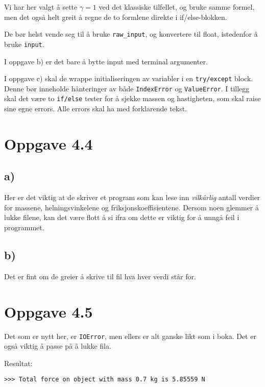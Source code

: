 \documentclass[10pt,a4paper]{article}
\begin{document}
Vi har her valgt å sette $\gamma = 1$ ved det klassiske tilfellet, og bruke samme formel, men det også helt greit å regne de to formlene direkte i if/else-blokken.

De bør helst vende seg til å bruke \texttt{raw\_input}, og konvertere til float, istedenfor å bruke \texttt{input}.

I oppgave b) er det bare å bytte input med terminal argumenter.

I oppgave c) skal de wrappe initialiseringen av variabler i en \texttt{try/except} block. Denne bør inneholde hånteringer av både \texttt{IndexError} og \texttt{ValueError}. I tillegg skal det være to \texttt{if/else} tester for å sjekke massen og hastigheten, som skal raise sine egne errors. Alle errors skal ha med forklarende tekst.




\newpage
\section*{Oppgave 4.4}
\subsection*{a)}
Her er det viktig at de skriver et program som kan lese inn \textit{vilkårlig} antall verdier for massene, helningsvinkelene og friksjonskoeffisientene. 
Dersom noen glemmer å lukke filene, kan det være flott å si ifra om dette er viktig for å unngå feil i programmet.

\subsection*{b)}
Det er fint om de greier å skrive til fil hva hver verdi står for. 

\newpage
\section*{Oppgave 4.5}
Det som er nytt her, er \texttt{IOError}, men ellers er alt ganske likt som i boka. Det er også viktig å passe på å lukke fila. 

Resultat:
\begin{verbatim}
>>> Total force on object with mass 0.7 kg is 5.85559 N
\end{verbatim}
\end{document}
